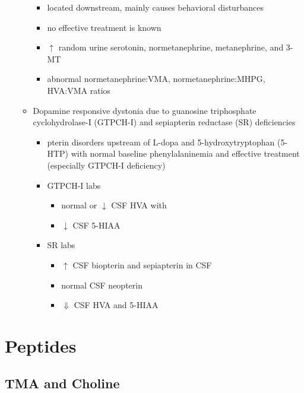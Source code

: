 \documentclass{scrartcl}
\begin{document}
\begin{itemize}
\begin{itemize}
\begin{itemize}
\item located downstream, mainly causes behavioral disturbances
\item no effective treatment is known
\item \(\uparrow\) random urine serotonin, normetanephrine, metanephrine, and 3-MT
\item abnormal normetanephrine:VMA, normetanephrine:MHPG, HVA:VMA ratios
\end{itemize}
\item Dopamine responsive dystonia due to guanosine triphosphate cyclohydrolase-I (GTPCH-I) and
sepiapterin reductase (SR) deficiencies
\begin{itemize}
\item pterin disorders upstream of L-dopa and
5-hydroxytryptophan (5-HTP) with normal baseline
phenylalaninemia and effective treatment (especially GTPCH-I
deficiency)
\item GTPCH-I labs
\begin{itemize}
\item normal or \(\downarrow\) CSF HVA with
\item \(\downarrow\) CSF 5-HIAA
\end{itemize}
\item SR labs
\begin{itemize}
\item \(\uparrow\) CSF biopterin and sepiapterin in CSF
\item normal CSF neopterin
\item \(\Downarrow\) CSF HVA and 5-HIAA
\end{itemize}
\end{itemize}
\end{itemize}
\end{itemize}
\section{Peptides}
\label{sec:org9727fff}
\subsection{TMA and Choline}
\label{sec:org9c35231}
\end{document}
